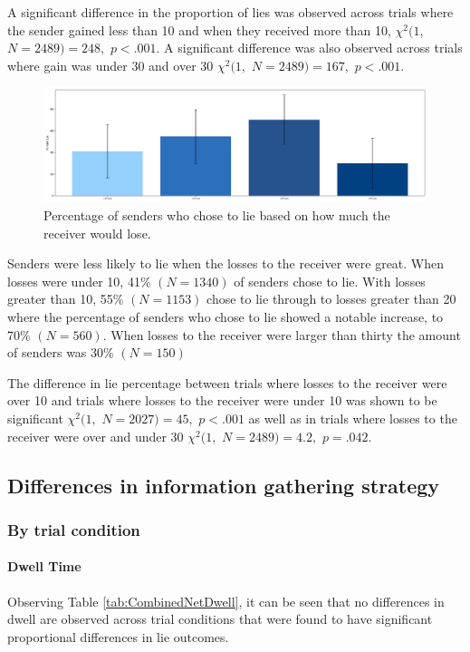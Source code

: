 \documentclass[man, floatsintext]{apa7}
\begin{document}
A significant difference in the proportion of lies was observed across trials where the sender gained less than 10 and when they received more than 10, $\chi^2(1,$ $N=2489) = 248,$ $p<.001$. A significant difference was also observed across trials where gain was under 30 and over 30 $\chi^2(1,$ $N=2489) = 167,$ $p<.001$.

\begin{figure}[H]
	\includegraphics[width=\linewidth]{../plots/RESPONSE/NetLossLie.png}
	\caption{Percentage of senders who chose to lie based on how much the receiver would lose.}
	\label{fig:NetLossLie}
\end{figure}

Senders were less likely to lie when the losses to the receiver were great. When losses were under 10,  41\% $(N = 1340)$ of senders chose to lie. With losses greater than 10, 55\%  $(N = 1153)$ chose to lie through to losses greater than 20 where the percentage of senders who chose to lie showed a notable increase, to 70\%  $(N = 560)$. When losses to the receiver were larger than thirty the amount of senders was 30\% $(N = 150)$

The difference in lie percentage between trials where losses to the receiver were over 10 and trials where losses to the receiver were under 10 was shown to be significant $\chi^2(1,$ $N=2027) = 45,$ $p<.001$ as well as in trials where losses to the receiver were over and under 30 $\chi^2(1,$ $N=2489) = 4.2,$ $p=.042$.

\subsection{Differences in information gathering strategy}

\subsubsection{By trial condition}

\paragraph{Dwell Time}
Observing Table \ref{tab:CombinedNetDwell}, it can be seen that no differences in dwell are observed across trial conditions that were found to have significant proportional differences in lie outcomes.
\end{document}
